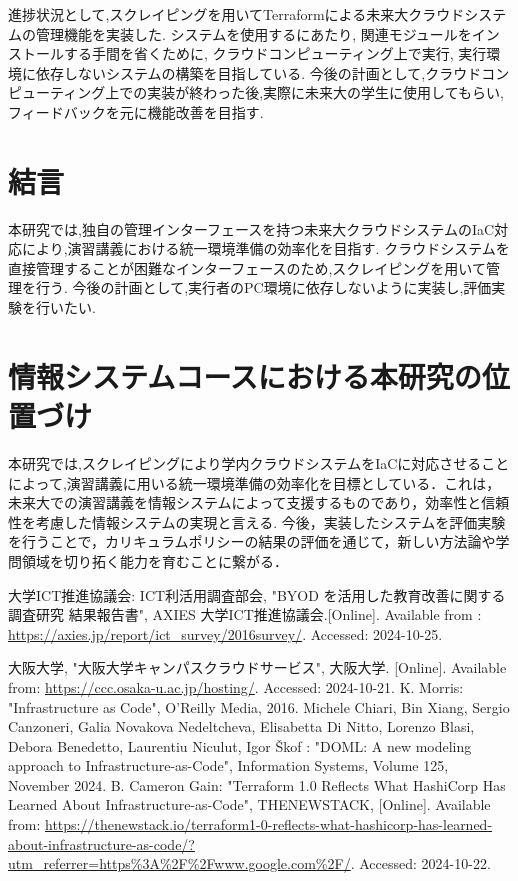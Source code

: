 \documentclass[11pt]{ujarticle}\sloppy
\begin{document}
進捗状況として,スクレイピングを用いてTerraformによる未来大クラウドシステムの管理機能を実装した.
システムを使用するにあたり,
関連モジュールをインストールする手間を省くために,
クラウドコンピューティング上で実行,
実行環境に依存しないシステムの構築を目指している.
今後の計画として,クラウドコンピューティング上での実装が終わった後,実際に未来大の学生に使用してもらい,フィードバックを元に機能改善を目指す.


\section{結言}

本研究では,独自の管理インターフェースを持つ未来大クラウドシステムのIaC対応により,演習講義における統一環境準備の効率化を目指す.
クラウドシステムを直接管理することが困難なインターフェースのため,スクレイピングを用いて管理を行う.
今後の計画として,実行者のPC環境に依存しないように実装し,評価実験を行いたい.


\section{情報システムコースにおける本研究の位置づけ}

本研究では,スクレイピングにより学内クラウドシステムをIaCに対応させることによって,演習講義に用いる統一環境準備の効率化を目標としている．これは，未来大での演習講義を情報システムによって支援するものであり，効率性と信頼性を考慮した情報システムの実現と言える.
今後，実装したシステムを評価実験を行うことで，カリキュラムポリシーの結果の評価を通じて，新しい方法論や学問領域を切り拓く能力を育むことに繋がる．

\begin{thebibliography}{99}
	大学ICT推進協議会: ICT利活用調査部会, "BYOD を活用した教育改善に関する調査研究 結果報告書", AXIES 大学ICT推進協議会.[Online]. Available from : \url{https://axies.jp/report/ict_survey/2016survey/}. Accessed: 2024-10-25.

	大阪大学, "大阪大学キャンパスクラウドサービス", 大阪大学. [Online]. Available from: \url{https://ccc.osaka-u.ac.jp/hosting/}. Accessed: 2024-10-21.
	K. Morris: "Infrastructure as Code", O'Reilly Media, 2016.
	Michele Chiari, Bin Xiang, Sergio Canzoneri, Galia Novakova Nedeltcheva, Elisabetta Di Nitto, Lorenzo Blasi, Debora Benedetto, Laurentiu Niculut, Igor Škof : "DOML: A new modeling approach to Infrastructure-as-Code", Information Systems, Volume 125, November 2024. 
	B. Cameron Gain: "Terraform 1.0 Reflects What HashiCorp Has Learned About Infrastructure-as-Code", THENEWSTACK, [Online]. Available from: \url{https://thenewstack.io/terraform1-0-reflects-what-hashicorp-has-learned-about-infrastructure-as-code/?utm_referrer=https%3A%2F%2Fwww.google.com%2F/}. Accessed: 2024-10-22.
\end{thebibliography}
\end{document}

